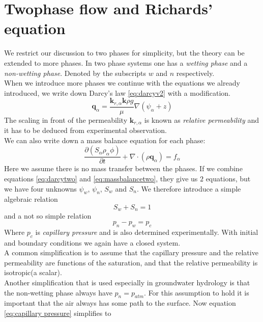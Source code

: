 \documentclass[../Main/main.tex]{subfiles}
\begin{document}
\section*{Twophase flow and Richards' equation}
We restrict our discussion to two phases for simplicity, but the theory can be extended to more phases. In two phase systems one has a \emph{wetting phase} and a \emph{non-wetting phase}. Denoted by the subscripts $w$ and $n$ respectively. \\
When we introduce more phases we continue with the equations we already introduced, we write down Darcy's law \eqref{eq:darcyv2} with a modification.
\begin{equation}\label{eq:darcytwo}
	\pmb{q}_{\alpha} = \frac{\pmb{k}_{r,\alpha}\pmb{k}\rho g}{\mu}\nabla(\psi_{\alpha} + z)
\end{equation}
The scaling in front of the permeability $\pmb{k}_{r,\alpha}$ is known as \emph{relative permeability} and it has to be deduced from experimental observation. \\ We can also write down a mass balance equation for each phase:
\begin{equation}\label{eq:massbalancetwo}
	\frac{\partial (S_{\alpha}\rho_{\alpha} \phi) }{\partial t} + \nabla \cdot (\rho \pmb{q}_{\alpha}) = f_{\alpha}
\end{equation}
Here we assume there is no mass transfer between the phases.
If we combine equations \eqref{eq:darcytwo} and \eqref{eq:massbalancetwo}, they give us $2$ equations, but we have four unknowns $\psi_w$, $\psi_n$, $S_w$ and $S_n$. We therefore introduce a simple algebraic relation
\begin{equation*}
	S_w + S_n = 1
\end{equation*}
and a not so simple relation
\begin{equation}\label{eq:capillary pressure}
	p_n-p_w = p_c
\end{equation}
Where $p_c$ is \emph{capillary pressure} and is also determined experimentally.
With initial and boundary conditions we again have a closed system.\\
A common simplification is to assume that the capillary pressure and the relative permeability are functions of the saturation, and that the relative permeability is isotropic(a scalar). \\
Another simplification that is used especially in groundwater hydrology is that the non-wetting phase always have $p_n = p_{atm}$. For this assumption to hold it is important that the air always has some path to the surface. Now equation \eqref{eq:capillary pressure} simplifies to
\end{document}
